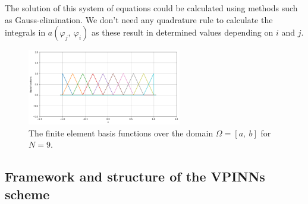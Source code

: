 The solution of this system of equations could be calculated using methods such as Gauss-elimination. We don't need
any quadrature rule to calculate the integrals in $a(\varphi_j,\:\varphi_i)$ as these result in determined values depending
on $i$ and $j$.

\begin{figure}[h]
    \label{fig:fembases}
    \centering
    \includegraphics[width = 0.6\textwidth]{img/FEMBasisFunctions.png}
    \caption{The finite element basis functions over the domain $\Omega = [a,\:b]$ for $N=9$.}
\end{figure}

\subsection{Framework and structure of the VPINNs scheme}\label{sec:vpinnsframework}

